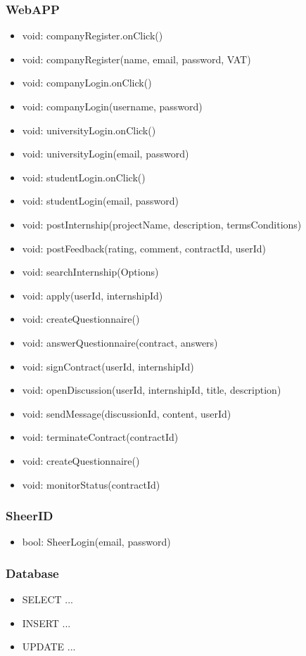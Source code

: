 \subsubsection{WebAPP}
\begin{itemize}
    \item void: companyRegister.onClick()
    \item void: companyRegister(name, email, password, VAT)
    \item void: companyLogin.onClick()
    \item void: companyLogin(username, password)
    \item void: universityLogin.onClick()
    \item void: universityLogin(email, password)
    \item void: studentLogin.onClick()
    \item void: studentLogin(email, password)
    \item void: postInternship(projectName, description, termsConditions)
    \item void: postFeedback(rating, comment, contractId, userId)
    \item void: searchInternship(Options)
    \item void: apply(userId, internshipId)
    \item void: createQuestionnaire()
    \item void: answerQuestionnaire(contract, answers)
    \item void: signContract(userId, internshipId)
    \item void: openDiscussion(userId, internshipId, title, description)
    \item void: sendMessage(discussionId, content, userId)
    \item void: terminateContract(contractId)
    \item void: createQuestionnaire()
    \item void: monitorStatus(contractId)
\end{itemize}
\subsubsection{SheerID}
\begin{itemize}
    \item bool: SheerLogin(email, password)
\end{itemize}
\subsubsection{Database}
\begin{itemize}
    \item SELECT ...
    \item INSERT ...
    \item UPDATE ...
\end{itemize}
